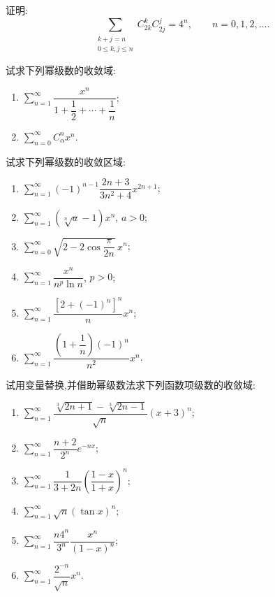 \documentclass[../数学分析培优讲义.tex]{subfiles}
\begin{document}
\begin{example}
证明:
\[
    \sum\limits_{\substack{k+j=n\\0\leq k,j\leq n}}C_{2k}^{k}C_{2j}^{j}=4^n,
    \qquad n=0,1,2,\ldots.
\]
\end{example}
\exampleblank

\begin{example}
试求下列幂级数的收敛域:
\begin{enumerate}[label=(\arabic*)]
    \item $\displaystyle\sum\limits_{n=1}^{\infty}\dfrac{x^n}{1+\dfrac{1}{2}+\cdots+\dfrac{1}{n}}$;
    \item $\displaystyle\sum\limits_{n=0}^{\infty}C_{\alpha}^{n}x^n$.
\end{enumerate}
\end{example}
\exampleblank

\begin{example}
试求下列幂级数的收敛区域:
\begin{enumerate}[label=(\arabic*)]
    \item $\displaystyle\sum\limits_{n=1}^{\infty}(-1)^{n-1}\dfrac{2n+3}{3n^2+4}x^{2n+1}$;
    \item $\displaystyle\sum\limits_{n=1}^{\infty}(\sqrt[n]{a}-1)x^n$, $a>0$;
    \item $\displaystyle\sum\limits_{n=0}^{\infty}\sqrt{2-2\cos\dfrac{\pi}{2n}}\,x^n$;
    \item $\displaystyle\sum\limits_{n=1}^{\infty}\dfrac{x^n}{n^p\ln n}$, $p>0$;
    \item $\displaystyle\sum\limits_{n=1}^{\infty}\dfrac{[2+(-1)^n]^n}{n}x^n$;
    \item $\displaystyle\sum\limits_{n=1}^{\infty}\dfrac{(1+\dfrac{1}{n})(-1)^n}{n^2}x^n$.
\end{enumerate}
\end{example}
\exampleblank

\begin{example}
试用变量替换,并借助幂级数法求下列函数项级数的收敛域:
\begin{enumerate}[label=(\arabic*)]
    \item $\displaystyle\sum\limits_{n=1}^{\infty}\dfrac{\sqrt[3]{2n+1}-\sqrt[3]{2n-1}}{\sqrt n}(x+3)^n$;
    \item $\displaystyle\sum\limits_{n=1}^{\infty}\dfrac{n+2}{2^n}e^{-nx}$;
    \item $\displaystyle\sum\limits_{n=1}^{\infty}\dfrac{1}{3+2n}\left(\dfrac{1-x}{1+x}\right)^n$;
    \item $\displaystyle\sum\limits_{n=1}^{\infty}\sqrt n(\tan x)^n$;
    \item $\displaystyle\sum\limits_{n=1}^{\infty}\dfrac{n4^n}{3^n}\dfrac{x^n}{(1-x)^n}$;
    \item $\displaystyle\sum\limits_{n=1}^{\infty}\dfrac{2^{-n}}{\sqrt n}x^n$.
\end{enumerate}
\end{example}
\exampleblank
\end{document}
